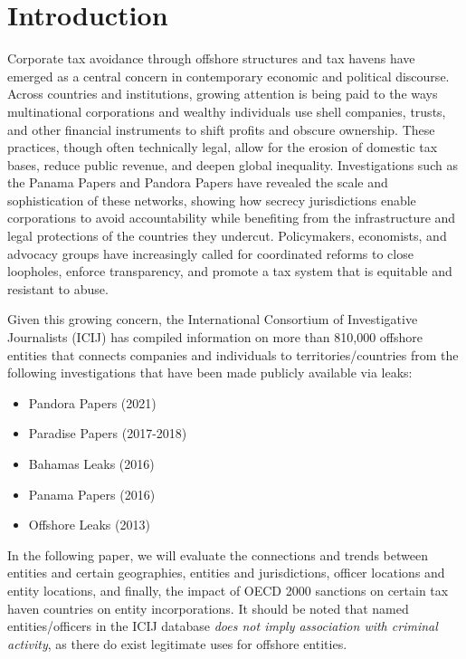 \documentclass{article}
\begin{document}
\newpage
\section{Introduction}

Corporate tax avoidance through offshore structures and tax havens have emerged as a central concern in contemporary economic and political discourse. Across countries and institutions, growing attention is being paid to the ways multinational corporations and wealthy individuals use shell companies, trusts, and other financial instruments to shift profits and obscure ownership. These practices, though often technically legal, allow for the erosion of domestic tax bases, reduce public revenue, and deepen global inequality. Investigations such as the Panama Papers and Pandora Papers have revealed the scale and sophistication of these networks, showing how secrecy jurisdictions enable corporations to avoid accountability while benefiting from the infrastructure and legal protections of the countries they undercut. Policymakers, economists, and advocacy groups have increasingly called for coordinated reforms to close loopholes, enforce transparency, and promote a tax system that is equitable and resistant to abuse.

Given this growing concern, the International Consortium of Investigative Journalists (ICIJ) has compiled information on more than 810,000 offshore entities that connects companies and individuals to territories/countries from the following investigations that have been made publicly available via leaks:

\begin{itemize}
    \item Pandora Papers (2021)
    \item Paradise Papers (2017-2018)
    \item Bahamas Leaks (2016)
    \item Panama Papers (2016)
    \item Offshore Leaks (2013)
\end{itemize}

In the following paper, we will evaluate the connections and trends between entities and certain geographies, entities and jurisdictions, officer locations and entity locations, and finally, the impact of OECD 2000 sanctions on certain tax haven countries on entity incorporations. It should be noted that named entities/officers in the ICIJ database \textit{does not imply association with criminal activity}, as there do exist legitimate uses for offshore entities.
\end{document}
